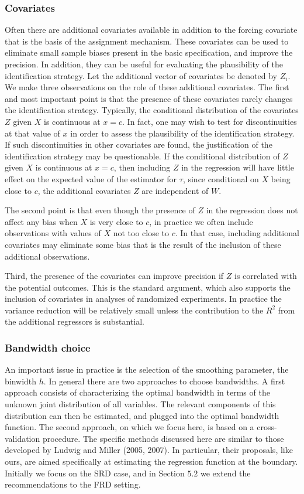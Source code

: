 \documentclass[11pt]{book}%
\begin{document}
\subsubsection{Covariates}
Often there are additional covariates available in addition to the forcing covariate that is the basis of the assignment mechanism. These covariates can be used to eliminate small sample biases present in the basic specification, and improve the precision. In addition, they can be useful for evaluating the plausibility of the identification strategy.  Let the additional vector of covariates be denoted by $Z_{i}$. We make three observations on the role of these additional covariates. The first and most important point is that the presence of these covariates rarely changes the identification strategy. Typically, the conditional distribution of the covariates $Z$ given $X$ is continuous at $x=c .$ In fact, one may wish to test for discontinuities at that value of $x$ in order to assess the plausibility of the identification strategy. If such discontinuities in other covariates are found, the justification of the identification strategy may be questionable. If the conditional distribution of $Z$ given $X$ is continuous at $x=c$, then including $Z$ in the regression will have little effect on the expected value of the estimator for $\tau$, since conditional on $X$ being close to $c$, the additional covariates $Z$ are independent of $W$.

The second point is that even though the presence of $Z$ in the regression does not affect any bias when $X$ is very close to $c$, in practice we often include observations with values of $X$ not too close to $c$. In that case, including additional covariates may eliminate some bias that is the result of the inclusion of these additional observations.

Third, the presence of the covariates can improve precision if $Z$ is correlated with the potential outcomes. This is the standard argument, which also supports the inclusion of covariates in analyses of randomized experiments. In practice the variance reduction will be relatively small unless the contribution to the $R^{2}$ from the additional regressors is substantial.

\subsubsection{Bandwidth choice}
An important issue in practice is the selection of the smoothing parameter, the binwidth $h$. In general there are two approaches to choose bandwidths. A first approach consists of characterizing the optimal bandwidth in terms of the unknown joint distribution of all variables. The relevant components of this distribution can then be estimated, and plugged into the optimal bandwidth function. The second approach, on which we focus here, is based on a cross-validation procedure. The specific methods discussed here are similar to those developed by Ludwig and Miller (2005, 2007). In particular, their proposals, like ours, are aimed specifically at estimating the regression function at the boundary. Initially we focus on the SRD case, and in Section $5.2$ we extend the recommendations to the FRD setting.
\end{document}
